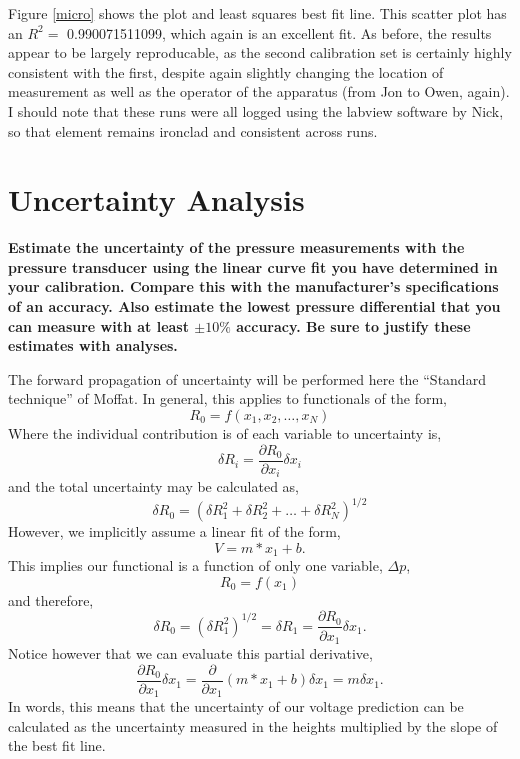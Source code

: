 \documentclass{article}
\begin{document}
Figure \ref{micro} shows the plot and least squares best fit line. 
This scatter plot has an $R^2 =$ 0.990071511099, which again is an
excellent fit. As before, the results appear to be largely reproducable,
as the second calibration set is certainly highly consistent with the
first, despite again slightly changing the location of measurement as
well as the operator of the apparatus (from Jon to Owen, again). I
should note that these runs were all logged using the labview software
by Nick, so that element remains ironclad and consistent across runs. 

\newpage
\section{Uncertainty Analysis}

\textbf{Estimate the uncertainty of the pressure measurements with the
pressure transducer using the linear curve fit you have determined in
your calibration. Compare this with the manufacturer's specifications of
an accuracy. Also estimate the lowest pressure differential that you can
measure with at least $\pm 10\%$ accuracy. Be sure to justify these
estimates with analyses.}

The forward propagation of uncertainty will be performed here the
``Standard technique'' of Moffat. In general, this applies to
functionals of the form, 
\begin{equation}
  R_0 = f(x_1,x_2, \ldots ,x_N)
\end{equation}
Where the individual contribution is of each variable to uncertainty is,
\begin{equation}
  \delta R_i = \frac{\partial R_0}{\partial x_i} \delta x_i
\end{equation}
and the total uncertainty may be calculated as, 
\begin{equation}
  \delta R_0 = \left(\delta R_1^2 + \delta R_2^2 + \ldots + \delta R_N^2 \right)^{1/2}
\end{equation}
However, we implicitly assume a linear fit of the form, 
\begin{equation}
  V = m*x_1 + b. 
\end{equation}
This implies our functional is a function of only one variable, $\Delta p$, 
\begin{equation}
  R_0 = f(x_1)
\end{equation}
and therefore,
\begin{equation}
  \delta R_0 = \left(\delta R_1^2 \right)^{1/2} = \delta R_1 =
   \frac{\partial R_0}{\partial x_1} \delta x_1.
\end{equation}
 Notice however that we can evaluate this partial derivative, 
\begin{equation}
 \frac{\partial R_0}{\partial x_1} \delta x_1 = \frac{\partial}{\partial
  x_1}\left( m*x_1 +b \right) \delta x_1 = m \delta x_1. 
\end{equation}
In words, this means that the uncertainty of our voltage prediction can
be calculated as the uncertainty measured in the heights multiplied by
the slope of the best fit line. 
\end{document}
